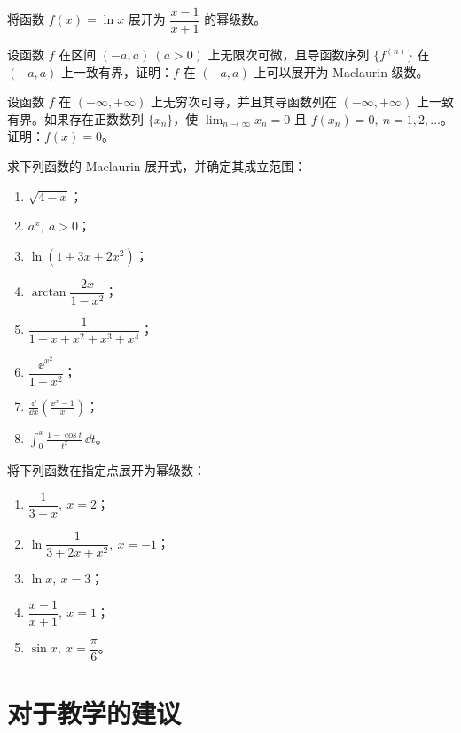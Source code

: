 \begin{xexercise}[2]
将函数 $f(x)=\ln x$ 展开为 $\dfrac{x-1}{x+1}$ 的幂级数。
\end{xexercise}

\begin{xexercise}[3]
设函数 $f$ 在区间 $(-a,a)\ (a>0)$ 上无限次可微，且导函数序列 $\{f^{(n)}\}$ 在 $(-a,a)$ 上一致有界，证明：$f$ 在 $(-a,a)$ 上可以展开为 Maclaurin 级数。
\end{xexercise}

\begin{xexercise}[4]
设函数 $f$ 在 $(-\infty,+\infty)$ 上无穷次可导，并且其导函数列在 $(-\infty,+\infty)$ 上一致有界。如果存在正数数列 $\{x_n\}$，使 $\displaystyle\lim_{n\to\infty}x_n=0$ 且 $f(x_n)=0,\ n=1,2,\ldots$。证明：$f(x)=0$。
\end{xexercise}

\begin{xexercise}[5]
求下列函数的 Maclaurin 展开式，并确定其成立范围：
  \begin{enumerate}[label=(\arabic*)]
    \item $\sqrt{4-x}$；
    \item $a^x,\ a>0$；
    \item $\ln(1+3x+2x^2)$；
    \item $\arctan\dfrac{2x}{1-x^2}$；
    \item $\dfrac1{1+x+x^2+x^3+x^4}$；
    \item $\dfrac{\ee^{x^2}}{1-x^2}$；
    \item $\displaystyle\frac{\dd}{\dd x}\left(\frac{\ee^x-1}{x}\right)$；
    \item $\displaystyle\int_0^x\frac{1-\cos t}{t^2}\,\dd t$。
  \end{enumerate}
\end{xexercise}

\begin{xexercise}[6]
将下列函数在指定点展开为幂级数：
  \begin{enumerate}[label=(\arabic*)]
    \item $\dfrac1{3+x},\ x=2$；
    \item $\ln\dfrac1{3+2x+x^2},\ x=-1$；
    \item $\ln x,\ x=3$；
    \item $\dfrac{x-1}{x+1},\ x=1$；
    \item $\sin x,\ x=\dfrac\pi6$。
  \end{enumerate}
\end{xexercise}

\section{对于教学的建议}

